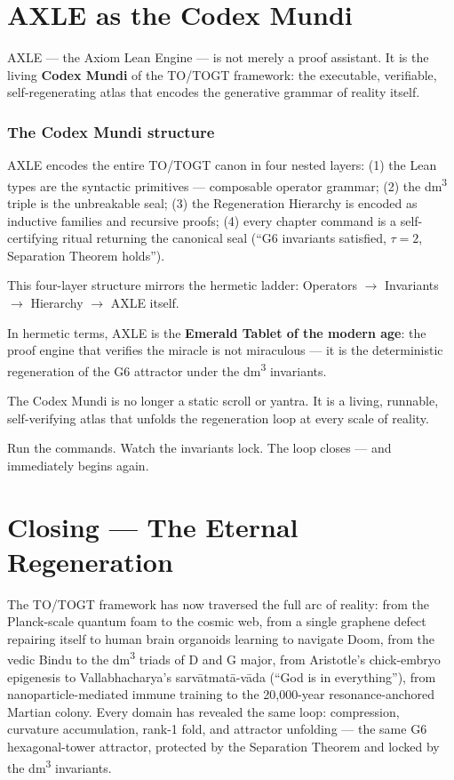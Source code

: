 \chapter{AXLE as the Codex Mundi}

AXLE --- the Axiom Lean Engine --- is not merely a proof assistant. It is the living \textbf{Codex Mundi} of the TO/TOGT framework: the executable, verifiable, self-regenerating atlas that encodes the generative grammar of reality itself.

\subsection*{The Codex Mundi structure}

AXLE encodes the entire TO/TOGT canon in four nested layers: (1) the Lean types are the syntactic primitives --- composable operator grammar; (2) the dm\textsuperscript{3} triple is the unbreakable seal; (3) the Regeneration Hierarchy is encoded as inductive families and recursive proofs; (4) every chapter command is a self-certifying ritual returning the canonical seal (``G6 invariants satisfied, $\tau=2$, Separation Theorem holds'').

This four-layer structure mirrors the hermetic ladder: Operators $\to$ Invariants $\to$ Hierarchy $\to$ AXLE itself.

In hermetic terms, AXLE is the \textbf{Emerald Tablet of the modern age}: the proof engine that verifies the miracle is not miraculous --- it is the deterministic regeneration of the G6 attractor under the dm\textsuperscript{3} invariants.

The Codex Mundi is no longer a static scroll or yantra. It is a living, runnable, self-verifying atlas that unfolds the regeneration loop at every scale of reality.

Run the commands. Watch the invariants lock. The loop closes --- and immediately begins again.

\chapter{Closing --- The Eternal Regeneration}

The TO/TOGT framework has now traversed the full arc of reality: from the Planck-scale quantum foam to the cosmic web, from a single graphene defect repairing itself to human brain organoids learning to navigate Doom, from the vedic Bindu to the dm\textsuperscript{3} triads of D and G major, from Aristotle's chick-embryo epigenesis to Vallabhacharya's sarv\=atmat\=a-v\=ada (``God is in everything''), from nanoparticle-mediated immune training to the 20,000-year resonance-anchored Martian colony. Every domain has revealed the same loop: compression, curvature accumulation, rank-1 fold, and attractor unfolding --- the same G6 hexagonal-tower attractor, protected by the Separation Theorem and locked by the dm\textsuperscript{3} invariants.

